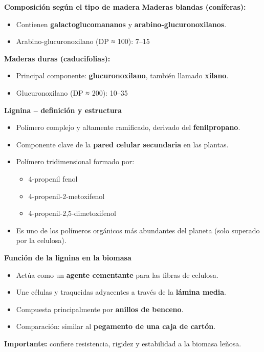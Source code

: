 \documentclass[../../main.tex]{subfiles}
\begin{document}
\begin{frame}{\textbf{Composición según el tipo de madera}}
\textbf{Maderas blandas (coníferas):}
\begin{itemize}
  \item Contienen \textbf{galactoglucomananos} y \textbf{arabino-glucuronoxilanos}.
  \item Arabino-glucuronoxilano (DP ≈ 100): 7–15 %
\end{itemize}

\textbf{Maderas duras (caducifolias):}
\begin{itemize}
  \item Principal componente: \textbf{glucuronoxilano}, también llamado \textbf{xilano}.
  \item Glucuronoxilano (DP ≈ 200): 10–35 %
\end{itemize}
\end{frame}

\begin{frame}{\textbf{ Lignina – definición y estructura}}
\begin{itemize}
  \item Polímero complejo y altamente ramificado, derivado del \textbf{fenilpropano}.
  \item Componente clave de la \textbf{pared celular secundaria} en las plantas.
  \item Polímero tridimensional formado por:
  \begin{itemize}
    \item 4-propenil fenol
    \item 4-propenil-2-metoxifenol
    \item 4-propenil-2,5-dimetoxifenol
  \end{itemize}
  \item Es uno de los polímeros orgánicos más abundantes del planeta (solo superado por la celulosa).
\end{itemize}
\end{frame}
\begin{frame}{\textbf{Función de la lignina en la biomasa}}
\begin{itemize}
  \item Actúa como un \textbf{agente cementante} para las fibras de celulosa.
  \item Une células y traqueidas adyacentes a través de la \textbf{lámina media}.
  \item Compuesta principalmente por \textbf{anillos de benceno}.
  \item Comparación: similar al \textbf{pegamento de una caja de cartón}.
\end{itemize}

\vspace{0.5em}
\textbf{Importante:} confiere resistencia, rigidez y estabilidad a la biomasa leñosa.
\end{frame}
\end{document}
